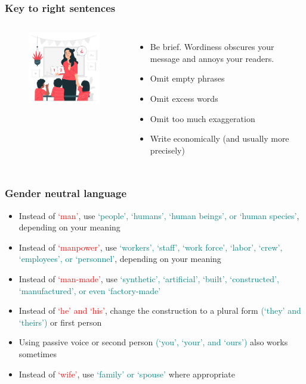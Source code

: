 \documentclass[newPxFont,sthlmFooter]{beamer}
\newcommand{\fs}{\footnotesize}
\begin{document}
\begin{frame}\frametitle{Key to right sentences}
  \begin{columns}[T,onlytextwidth]
  \begin{figure}
    \centering
    \includegraphics[width=2in]{figs/teach} 
  \end{figure}
      \vspace{1cm}
  \begin{itemize}
  \fs
  \item Be brief. Wordiness obscures your message and annoys your readers.
  \item Omit empty phrases
  \item Omit excess words
  \item Omit too much exaggeration
  \item Write economically (and usually more precisely)
  \end{itemize}
  \vspace{-2cm}
  \end{columns}
\end{frame}

\begin{frame}\frametitle{Gender neutral language}
  \begin{itemize}
  \fs
  \item Instead of \textcolor{red}{`man'}, use \textcolor{teal}{`people', `humans', `human beings', or `human species'}, depending on your meaning
  \item Instead of \textcolor{red}{`manpower'}, use \textcolor{teal}{`workers', `staff', `work force', `labor', `crew', `employees', or `personnel'}, depending on your meaning
  \item Instead of \textcolor{red}{`man-made'}, use \textcolor{teal}{`synthetic', `artificial', `built', `constructed', `manufactured', or even `factory-made'}
  \item Instead of \textcolor{red}{`he' and `his'}, change the construction to a plural form \textcolor{teal}{(`they' and `theirs')} or first person
  \item Using passive voice or second person \textcolor{teal}{(`you', `your', and `ours')} also works sometimes
  \item Instead of \textcolor{red}{`wife'}, use \textcolor{teal}{`family' or `spouse'} where appropriate
  \end{itemize}
\end{frame}
\end{document}
